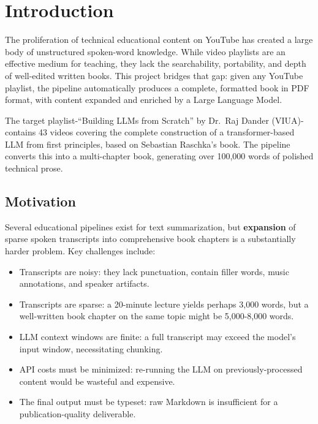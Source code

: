 \documentclass[11pt,a4paper]{article}
\begin{document}
\tableofcontents

\section{Introduction}

The proliferation of technical educational content on YouTube has created a large body of unstructured spoken-word knowledge. While video playlists are an effective medium for teaching, they lack the searchability, portability, and depth of well-edited written books. This project bridges that gap: given any YouTube playlist, the pipeline automatically produces a complete, formatted book in PDF format, with content expanded and enriched by a Large Language Model.

The target playlist-``Building LLMs from Scratch'' by Dr.\ Raj Dander (VIUA)-contains 43 videos covering the complete construction of a transformer-based LLM from first principles, based on Sebastian Raschka's book. The pipeline converts this into a multi-chapter book, generating over 100,000 words of polished technical prose.

\subsection{Motivation}

Several educational pipelines exist for text summarization, but \textbf{expansion} of sparse spoken transcripts into comprehensive book chapters is a substantially harder problem. Key challenges include:

\begin{itemize}[leftmargin=1.5em]
    \item Transcripts are noisy: they lack punctuation, contain filler words, music annotations, and speaker artifacts.
    \item Transcripts are sparse: a 20-minute lecture yields perhaps 3,000 words, but a well-written book chapter on the same topic might be 5,000-8,000 words.
    \item LLM context windows are finite: a full transcript may exceed the model's input window, necessitating chunking.
    \item API costs must be minimized: re-running the LLM on previously-processed content would be wasteful and expensive.
    \item The final output must be typeset: raw Markdown is insufficient for a publication-quality deliverable.
\end{itemize}
\end{document}

